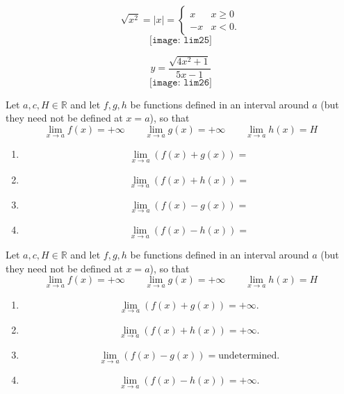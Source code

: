 \documentclass{beamer}
\begin{document}
\begin{frame}{
	$$\sqrt{x^2}=|x|=\begin{cases}
x & x\geq 0\\
-x & x<0.
\end{cases}$$}
$$
\texttt{[image: lim25]}
$$
\end{frame}

\begin{frame}{
$$y=\frac{\sqrt{4x^2+1}}{5x-1}$$}
		$$
\texttt{[image: lim26]}
$$
\end{frame}

\begin{frame}

\begin{theorem}
	Let $a,c,H\in \mathbb{R}$ and let $f,g,h$ be functions defined in an interval around $a$ (but they need not be defined at $x=a$), so that 
	$$ \lim_{x\to a}f(x)=+\infty \quad \quad \lim_{x\to a}g(x)=+\infty \quad \quad \lim_{x\to a}h(x)=H$$
	\begin{enumerate}
		\item $$\lim_{x\to a}(f(x)+g(x))=$$
		\item $$\lim_{x\to a}(f(x)+h(x))=$$
		\item $$\lim_{x\to a}(f(x)-g(x))=$$
		\item $$\lim_{x\to a}(f(x)-h(x))=$$
	\end{enumerate}
\end{theorem}
\end{frame}

\begin{frame}
\begin{theorem}
	Let $a,c,H\in \mathbb{R}$ and let $f,g,h$ be functions defined in an interval around $a$ (but they need not be defined at $x=a$), so that 
	$$ \lim_{x\to a}f(x)=+\infty \quad \quad \lim_{x\to a}g(x)=+\infty \quad \quad \lim_{x\to a}h(x)=H$$
	\begin{enumerate}
		\item $$\lim_{x\to a}(f(x)+g(x))=+\infty.$$
		\item $$\lim_{x\to a}(f(x)+h(x))=+\infty.$$
		\item $$\lim_{x\to a}(f(x)-g(x))=\text{undetermined}.$$
		\item $$\lim_{x\to a}(f(x)-h(x))=+\infty.$$
	\end{enumerate}
\end{theorem}
\end{frame}
\end{document}
